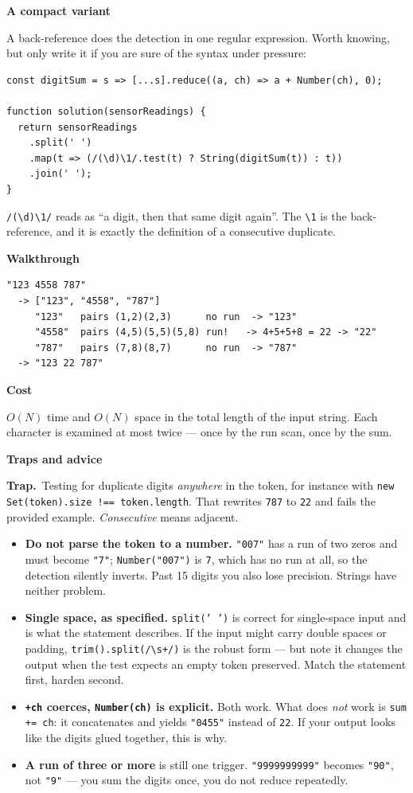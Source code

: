\documentclass[11pt,a4paper]{article}
\newcommand{\blk}[1]{\par\smallskip\noindent\textbf{\color{accent}#1}\par\nopagebreak}
\newcommand{\trap}[1]{\par\smallskip\noindent\textbf{\color{bad}Trap.}\ #1\par}
\begin{document}
\blk{A compact variant}
A back-reference does the detection in one regular expression. Worth knowing,
but only write it if you are sure of the syntax under pressure:

\begin{lstlisting}
const digitSum = s => [...s].reduce((a, ch) => a + Number(ch), 0);

function solution(sensorReadings) {
  return sensorReadings
    .split(' ')
    .map(t => (/(\d)\1/.test(t) ? String(digitSum(t)) : t))
    .join(' ');
}
\end{lstlisting}

\noindent \texttt{/(\textbackslash d)\textbackslash 1/} reads as ``a digit,
then that same digit again''. The \texttt{\textbackslash 1} is the
back-reference, and it is exactly the definition of a consecutive duplicate.

\blk{Walkthrough}
\begin{lstlisting}[style=plain]
"123 4558 787"
  -> ["123", "4558", "787"]
     "123"   pairs (1,2)(2,3)      no run  -> "123"
     "4558"  pairs (4,5)(5,5)(5,8) run!   -> 4+5+5+8 = 22 -> "22"
     "787"   pairs (7,8)(8,7)      no run  -> "787"
  -> "123 22 787"
\end{lstlisting}

\blk{Cost}
$O(N)$ time and $O(N)$ space in the total length of the input string. Each
character is examined at most twice --- once by the run scan, once by the sum.

\blk{Traps and advice}
\trap{Testing for duplicate digits \emph{anywhere} in the token, for instance
with \texttt{new Set(token).size !== token.length}. That rewrites \texttt{787}
to \texttt{22} and fails the provided example. \emph{Consecutive} means
adjacent.}

\begin{itemize}
  \item \textbf{Do not parse the token to a number.} \texttt{"007"} has a run of
        two zeros and must become \texttt{"7"}; \texttt{Number("007")} is
        \texttt{7}, which has no run at all, so the detection silently inverts.
        Past 15 digits you also lose precision. Strings have neither problem.
  \item \textbf{Single space, as specified.} \texttt{split(' ')} is correct for
        single-space input and is what the statement describes. If the input
        might carry double spaces or padding, \texttt{trim().split(/\textbackslash s+/)}
        is the robust form --- but note it changes the output when the test
        expects an empty token preserved. Match the statement first, harden
        second.
  \item \textbf{\texttt{+ch} coerces, \texttt{Number(ch)} is explicit.} Both
        work. What does \emph{not} work is \texttt{sum += ch}: it concatenates
        and yields \texttt{"0455"} instead of \texttt{22}. If your output looks
        like the digits glued together, this is why.
  \item \textbf{A run of three or more} is still one trigger.
        \texttt{"9999999999"} becomes \texttt{"90"}, not \texttt{"9"} --- you sum
        the digits once, you do not reduce repeatedly.
\end{itemize}
\end{document}
